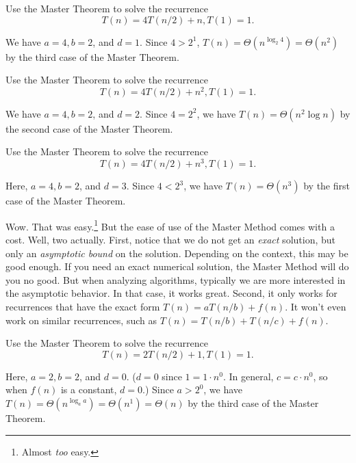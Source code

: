\begin{exa}
Use the Master Theorem to solve the recurrence 
$$T(n) = 4T(n/2) + n, T(1)=1.$$
 \begin{sol} 
We have $a=4, b=2$, and $d = 1$. 
Since $4>2^1$, $T(n)=\Theta(n^{\log_2{4}})=\Theta(n^2)$ by the third case of the Master Theorem.
\end{sol}
\end{exa}

\begin{exa}
Use the Master Theorem to solve the recurrence 
$$T(n) = 4T(n/2) + n^{2}, T(1)=1.$$
\begin{sol} 
We have $a=4, b=2$, and $d=2$.
Since $4=2^2$, we have $T(n)=\Theta(n^2\log n)$ by the second case of the Master Theorem.
\end{sol}
\end{exa}

\begin{exa}
Use the Master Theorem to solve the recurrence 
$$T(n) = 4T(n/2) + n^{3}, T(1)=1.$$
\begin{sol}
Here, $a=4, b=2$, and $d=3$.
Since $4<2^3$, we have $T(n)=\Theta(n^3)$ by the first case of the Master Theorem.
\end{sol}
\end{exa}

Wow.  That was easy.\footnote{Almost {\em too} easy.}
But the ease of use of the Master Method comes with a cost.  Well, two actually.
First, notice that we do not
get an {\em exact} solution, but only an {\em asymptotic bound} on the solution.  Depending on
the context, this may be good enough.  If you need an exact numerical solution, the Master
Method will do you no good.  But when analyzing algorithms, typically we are more interested
in the asymptotic behavior.  In that case, it works great.
Second, it only works for recurrences that have the exact form $T(n)=aT(n/b)+f(n)$.
It won't even work on similar recurrences, 
such as $T(n)=T(n/b)+T(n/c)+f(n)$.


\begin{exer}
Use the Master Theorem to solve the recurrence 
$$T(n) = 2T(n/2) + 1, T(1)=1.$$
\vspace*{1.25in}
\begin{answer}
Here, $a=2, b=2$, and $d=0$. ($d=0$ since $1=1\cdot n^0$.  In general, $c=c\cdot n^0$, so when 
$f(n)$ is a constant, $d=0$.)
Since $a>2^0$, we have $T(n)=\Theta(n^{\log_aa})=\Theta(n^1)=\Theta(n)$ 
by the third case of the Master Theorem.
\end{answer}
\end{exer}

